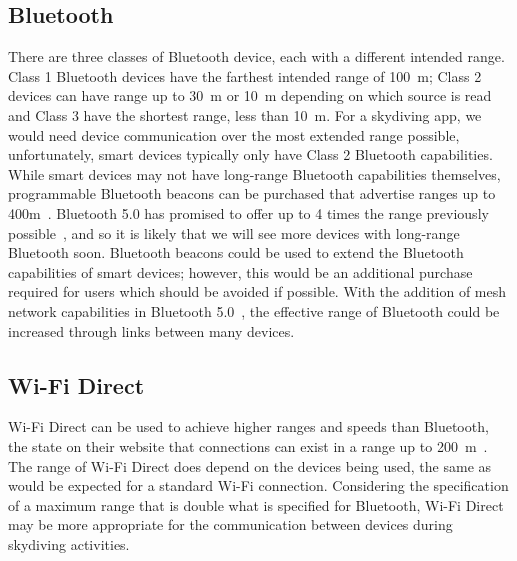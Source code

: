 \documentclass[11pt, a4paper, twocolumn]{article}
\begin{document}
\subsection{Bluetooth}\label{sec:bluetooth} %

There are three classes of Bluetooth device, each with a different intended range. Class 1 Bluetooth devices have the farthest intended range of \SI{100}{\metre}; Class 2 devices can have range up to \SI{30}{\metre} or \SI{10}{\metre} depending on which source is read~\cite{noauthor_bluetooth_nodate, wright_dispelling_nodate} and Class 3 have the shortest range, less than \SI{10}{\metre}.
For a skydiving app, we would need device communication over the most extended range possible, unfortunately, smart devices typically only have Class 2 Bluetooth capabilities. While smart devices may not have long-range Bluetooth capabilities themselves, programmable Bluetooth beacons can be purchased that advertise ranges up to 400m~\cite{noauthor_coin_nodate}. Bluetooth 5.0 has promised to offer up to 4 times the range previously possible~\cite{bluetooth_sig_inc_rethinking_nodate}, and so it is likely that we will see more devices with long-range Bluetooth soon. Bluetooth beacons could be used to extend the Bluetooth capabilities of smart devices; however, this would be an additional purchase required for users which should be avoided if possible. With the addition of mesh network capabilities in Bluetooth 5.0~\cite{noauthor_mesh_nodate}, the effective range of Bluetooth could be increased through links between many devices.

\subsection{Wi-Fi Direct}\label{sec:wifi-direct} %

Wi-Fi Direct can be used to achieve higher ranges and speeds than Bluetooth, the \citeauthor{wi-fi_alliance_wi-fi_nodate} state on their website that connections can exist in a range up to \SI{200}{\metre}~\cite{wi-fi_alliance_wi-fi_nodate}. The range of Wi-Fi Direct does depend on the devices being used, the same as would be expected for a standard Wi-Fi connection. Considering the specification of a maximum range that is double what is specified for Bluetooth, Wi-Fi Direct may be more appropriate for the communication between devices during skydiving activities.
\end{document}
